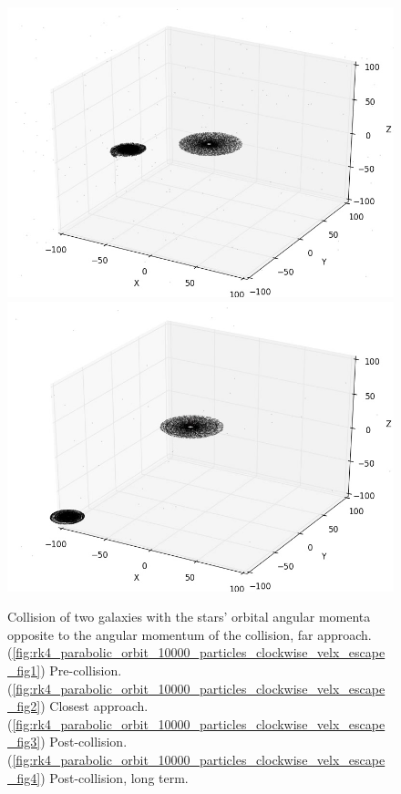 \documentclass[10pt,letterpaper]{article}
\begin{document}
\begin{figure}[!htb]
  \subcaption{}\label{fig:rk4_parabolic_orbit_10000_particles_clockwise_velx_escape_fig2}
\endminipage\hfill
{}%
  \includegraphics[width=\linewidth]{figures/galaxy_collisions/rk4_parabolic_orbit_10000_particles_clockwise_velx_escape_fig3.png}
  \subcaption{}\label{fig:rk4_parabolic_orbit_10000_particles_clockwise_velx_escape_fig3}
\endminipage
{}%
  \includegraphics[width=\linewidth]{figures/galaxy_collisions/rk4_parabolic_orbit_10000_particles_clockwise_velx_escape_fig4.png}
  \subcaption{}\label{fig:rk4_parabolic_orbit_10000_particles_clockwise_velx_escape_fig4}
\endminipage
\caption{Collision of two galaxies with the stars' orbital angular momenta opposite to the angular momentum of the collision, far approach. (\ref{fig:rk4_parabolic_orbit_10000_particles_clockwise_velx_escape_fig1}) Pre-collision. (\ref{fig:rk4_parabolic_orbit_10000_particles_clockwise_velx_escape_fig2}) Closest approach. (\ref{fig:rk4_parabolic_orbit_10000_particles_clockwise_velx_escape_fig3}) Post-collision. (\ref{fig:rk4_parabolic_orbit_10000_particles_clockwise_velx_escape_fig4})
Post-collision, long term.}\label{fig:rk4_parabolic_orbit_10000_particles_clockwise_velx_escape}
\end{figure}
\end{document}
